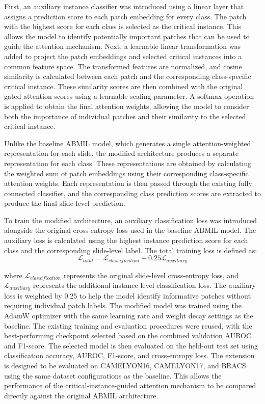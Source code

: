 \documentclass[journal]{IEEEtran}
\begin{document}
First, an auxiliary instance classifier was introduced using a linear layer that assigns a prediction score to each patch embedding for every class. The patch with the highest score for each class is selected as the critical instance. This allows the model to identify potentially important patches that can be used to guide the attention mechanism. Next, a learnable linear transformation was added to project the patch embeddings and selected critical instances into a common feature space. The transformed features are normalized, and cosine similarity is calculated between each patch and the corresponding class-specific critical instance. These similarity scores are then combined with the original gated attention scores using a learnable scaling parameter. A softmax operation is applied to obtain the final attention weights, allowing the model to consider both the importance of individual patches and their similarity to the selected critical instance.

Unlike the baseline ABMIL model, which generates a single attention-weighted representation for each slide, the modified architecture produces a separate representation for each class. These representations are obtained by calculating the weighted sum of patch embeddings using their corresponding class-specific attention weights. Each representation is then passed through the existing fully connected classifier, and the corresponding class prediction scores are extracted to produce the final slide-level prediction.

To train the modified architecture, an auxiliary classification loss was introduced alongside the original cross-entropy loss used in the baseline ABMIL model. The auxiliary loss is calculated using the highest instance prediction score for each class and the corresponding slide-level label. The total training loss is defined as:
\begin{equation}
\mathcal{L}_{total} = \mathcal{L}_{classification} + 0.25\mathcal{L}_{auxiliary}
\end{equation}

where \(\mathcal{L}_{classification}\) represents the original slide-level cross-entropy loss, and \(\mathcal{L}_{auxiliary}\) represents the additional instance-level classification loss. The auxiliary loss is weighted by 0.25 to help the model identify informative patches without requiring individual patch labels. The modified model was trained using the AdamW optimizer with the same learning rate and weight decay settings as the baseline. The existing training and evaluation procedures were reused, with the best-performing checkpoint selected based on the combined validation AUROC and F1-score. The selected model is then evaluated on the held-out test set using classification accuracy, AUROC, F1-score, and cross-entropy loss. The extension is designed to be evaluated on CAMELYON16, CAMELYON17, and BRACS using the same dataset configurations as the baseline. This allows the performance of the critical-instance-guided attention mechanism to be compared directly against the original ABMIL architecture.
\end{document}
